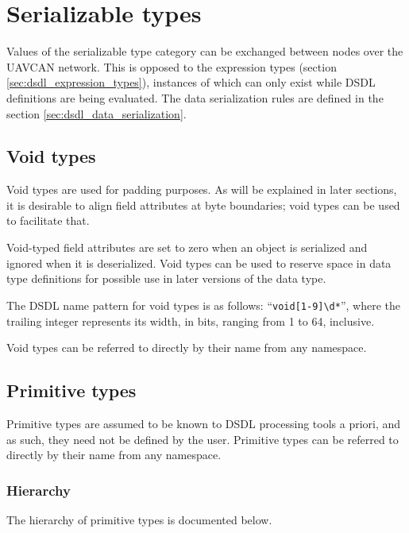 \section{Serializable types}\label{sec:dsdl_serializable_types}

Values of the serializable type category can be exchanged between nodes over the UAVCAN network.
This is opposed to the expression types (section \ref{sec:dsdl_expression_types}),
instances of which can only exist while DSDL definitions are being evaluated.
The data serialization rules are defined in the section \ref{sec:dsdl_data_serialization}.

\subsection{Void types}

Void types are used for padding purposes.
As will be explained in later sections, it is desirable to align field attributes at byte boundaries;
void types can be used to facilitate that.

Void-typed field attributes are set to zero when an object is serialized and ignored when it is deserialized.
Void types can be used to reserve space in data type definitions for possible use in later versions of the data type.

The DSDL name pattern for void types is as follows: ``\verb|void[1-9]\d*|'',
where the trailing integer represents its width, in bits,
ranging from 1 to 64, inclusive.

Void types can be referred to directly by their name from any namespace.

\subsection{Primitive types}\label{sec:dsdl_primitive_types}

Primitive types are assumed to be known to DSDL processing tools a priori,
and as such, they need not be defined by the user.
Primitive types can be referred to directly by their name from any namespace.

\subsubsection{Hierarchy}

The hierarchy of primitive types is documented below.

